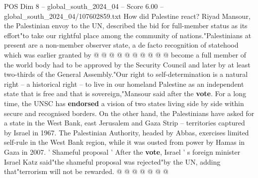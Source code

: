 \begin{textsample}{POS Dim 8 – global\_south\_2024\_04 – Score 6.00 – global\_south\_2024\_04/107602859.txt}
How did Palestine react?
Riyad Mansour, the Palestinian envoy to the UN, described the bid for full-member status as its effort"to take our rightful place among the community of nations."Palestinians at present are a non-member observer state, a de facto recognition of statehood which was earlier granted by @ @ @ @ @ @ @ @ @ @ become a full member of the world body had to be approved by the Security Council and later by at least two-thirds of the General Assembly."Our right to self-determination is a natural right -- a historical right -- to live in our homeland Palestine as an independent state that is free and that is sovereign,"Mansour said after the \textbf{vote}.
For a long time, the UNSC has \textbf{endorsed} a vision of two states living side by side within secure and recognised borders.
On the other hand, the Palestinians have asked for a state in the West Bank, east Jerusalem and Gaza Strip -- territories captured by Israel in 1967.
The Palestinian Authority, headed by Abbas, exercises limited self-rule in the West Bank region, while it was ousted from power by Hamas in Gaza in 2007. ' Shameful proposal ' After the \textbf{vote}, Israel ' s foreign minister Israel Katz said"the shameful proposal was rejected"by the UN, adding that"terrorism will not be rewarded. @ @ @ @ @ @ @

\end{textsample}
